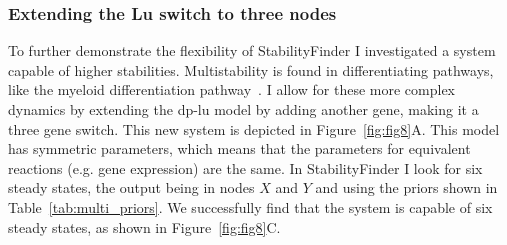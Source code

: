 

\clearpage
\subsubsection{Extending the Lu switch to three nodes}
To further demonstrate the flexibility of StabilityFinder I investigated a system capable of higher stabilities. Multistability is found in differentiating pathways, like the myeloid differentiation pathway~\autocite{Ghaffarizadeh:2014bt, Cinquin:2005go}. I allow for these more complex dynamics by extending the \acrshort{dp-lu} model by adding another gene, making it a three gene switch.  This new system is depicted in Figure~\ref{fig:fig8}A. This model has symmetric parameters, which means that the parameters for equivalent reactions (e.g. gene expression) are the same. In StabilityFinder I look for six steady states, the output being in nodes $X$ and $Y$ and using the priors shown in Table~\ref{tab:multi_priors}. We successfully find that the system is capable of six steady states, as shown in Figure~\ref{fig:fig8}C. 

